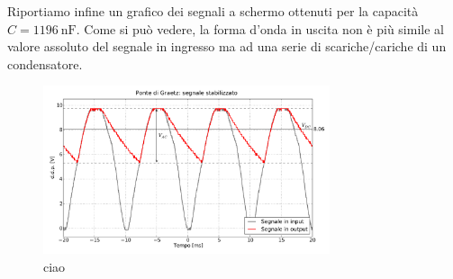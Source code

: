 Riportiamo infine un grafico dei segnali a schermo ottenuti per la capacità $C=\SI{1196}{\nano\farad}$. Come si può vedere, la forma d'onda in uscita non è più simile al valore assoluto del segnale in ingresso ma ad una serie di scariche/cariche di un condensatore.

\begin{figure}[h]
\center
	\includegraphics[width=0.75\textwidth]{ripple.pdf}
	\caption{ciao}
	\label{fig:ripple}
\end{figure}